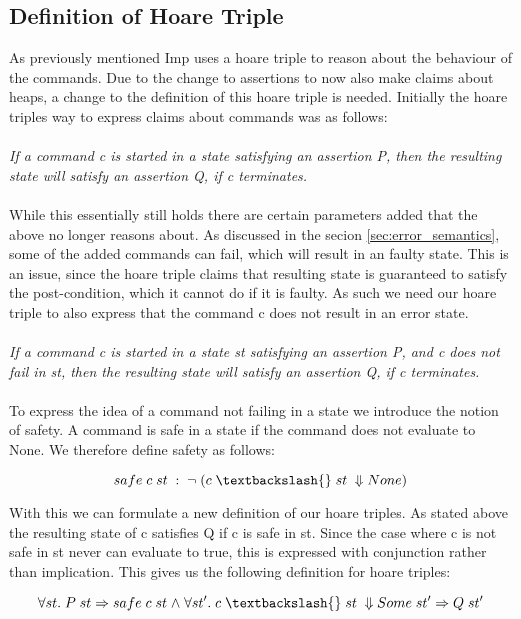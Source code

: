 \subsection{Definition of Hoare Triple}
\label{sec:hoare_triple}
As previously mentioned Imp uses a hoare triple to reason about the behaviour of the commands. Due to the change to assertions to now also make claims about heaps, a change to the definition of this hoare triple is needed. Initially the hoare triples way to express claims about commands was as follows:
\\
\\
\textit{If a command c is started in a state satisfying an assertion P, then the resulting state will satisfy an assertion Q, if c terminates.}
\\
\\
While this essentially still holds there are certain parameters added that the above no longer reasons about. As discussed in the secion \ref{sec:error_semantics}, some of the added commands can fail, which will result in an faulty state. This is an issue, since the hoare triple claims that resulting state is guaranteed to satisfy the post-condition, which it cannot do if it is faulty. As such we need our hoare triple to also express that the command c does not result in an error state.
\\
\\
\textit{If a command c is started in a state st satisfying an assertion P, and c does not fail in st, then the resulting state will satisfy an assertion Q, if c terminates.}
\\
\\

To express the idea of a command not failing in a state we introduce the notion of safety. A command is safe in a state if the command does not evaluate to None. We therefore define safety as follows:

\[safe\;c\;st\;: \;\neg \;(c \;\textbackslash{}\;st\;\Downarrow None)\]

With this we can formulate a new definition of our hoare triples. As stated above the resulting state of c satisfies Q if c is safe in st. Since the case where c is not safe in st never can evaluate to true, this is expressed with conjunction rather than implication. This gives us the following definition for hoare triples:

\[
\forall st.\; P\;st \impl safe\;c\;st \land \forall st'. \;c\;\textbackslash{}\;st\;\Downarrow Some\; st' \impl Q\;st'
\]	